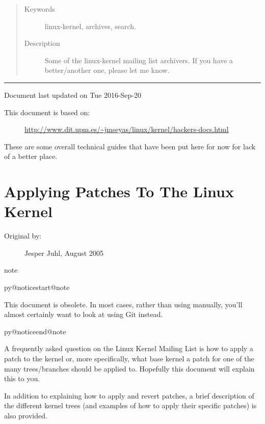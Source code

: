 \documentclass[a4paper,8pt,english]{sphinxmanual}
\makeatletter
\renewenvironment{notice}[2]{%
          \def\py@noticetype{#1}
          \begin{coloredbox}{#1}
          \bf\it
          \par\strong{#2}
          \csname py@noticestart@#1\endcsname
        }
	{
          \csname py@noticeend@\py@noticetype\endcsname
          \end{coloredbox}
        }
\makeatother
\begin{document}
\begin{itemize}
\begin{quote}
\begin{description}
\item[{Keywords}] \leavevmode
linux-kernel, archives, search.

\item[{Description}] \leavevmode
Some of the linux-kernel mailing list archivers. If
you have a better/another one, please let me know.

\end{description}\end{quote}

\end{itemize}


\bigskip\hrule{}\bigskip


Document last updated on Tue 2016-Sep-20
\begin{description}
\item[{This document is based on:}] \leavevmode
\href{http://www.dit.upm.es/~jmseyas/linux/kernel/hackers-docs.html}{http://www.dit.upm.es/\textasciitilde{}jmseyas/linux/kernel/hackers-docs.html}

\end{description}

These are some overall technical guides that have been put here for now for
lack of a better place.


\chapter{Applying Patches To The Linux Kernel}
\label{process/applying-patches:applying-patches-to-the-linux-kernel}\label{process/applying-patches::doc}\label{process/applying-patches:applying-patches}\begin{description}
\item[{Original by:}] \leavevmode
Jesper Juhl, August 2005

\end{description}

\begin{notice}{note}{Note:}
This document is obsolete.  In most cases, rather than using 
manually, you'll almost certainly want to look at using Git instead.
\end{notice}

A frequently asked question on the Linux Kernel Mailing List is how to apply
a patch to the kernel or, more specifically, what base kernel a patch for
one of the many trees/branches should be applied to. Hopefully this document
will explain this to you.

In addition to explaining how to apply and revert patches, a brief
description of the different kernel trees (and examples of how to apply
their specific patches) is also provided.
\end{document}
